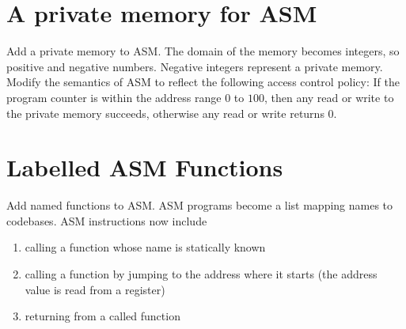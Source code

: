 \documentclass{article}
\begin{document}
\section{A private memory for ASM}
Add a private memory to ASM. The domain of the memory becomes integers, so positive and negative numbers. Negative integers represent a private memory. \\
Modify the semantics of ASM to reflect the following access control policy:
If the program counter is within the address range $0$ to $100$, then any read or write to the private memory succeeds, otherwise any read or write returns $0$.

\section{Labelled ASM Functions}
Add named functions to ASM. ASM programs become a list mapping names to codebases. ASM instructions now include
\begin{enumerate}
    \item calling a function whose name is statically known
    \item calling a function by jumping to the address where it starts (the address value is read from a register)
    \item returning from a called function
\end{enumerate}
\end{document}
